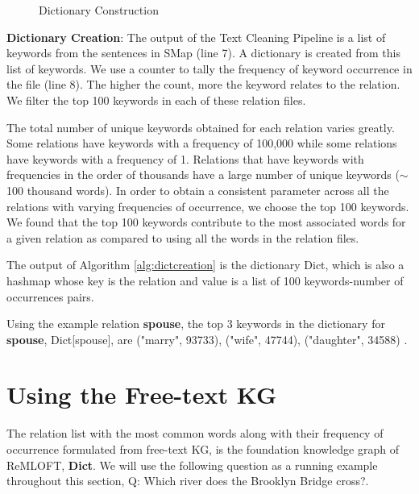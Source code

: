 \begin{sloppypar}
\begin{figure}
    \centering
    \caption{Dictionary Construction}
    \label{fig:graphConstruct}
\end{figure}

\textbf{Dictionary Creation}: The output of the Text Cleaning Pipeline is a list of keywords from the sentences in SMap (line 7). A dictionary is created from this list of keywords. We use a counter to tally the frequency of keyword occurrence in the file (line 8). The higher the count, more the keyword relates to the relation. We filter the top 100 keywords in each of these relation files. 

The total number of unique keywords obtained for each relation varies greatly. Some relations have keywords with a frequency of 100,000 while some relations have keywords with a frequency of 1. Relations that have keywords with frequencies in the order of thousands have a large number of unique keywords ($\sim$ 100 thousand words). In order to obtain a consistent parameter across all the relations with varying frequencies of occurrence, we choose the top 100 keywords. We found that the top 100 keywords contribute to the most associated words for a given relation as compared to using all the words in the relation files.

The output of Algorithm \ref{alg:dictcreation} is the dictionary Dict, which is also a hashmap whose key is the relation and value is a list of 100 keywords-number of occurrences pairs.

Using the example relation \textbf{spouse}, the top 3 keywords in the dictionary for \textbf{spouse}, Dict[spouse], are {\selectfont
("marry", 93733), ("wife", 47744), ("daughter", 34588)
}.
\section{Using the Free-text KG}
{\label{usingfreetextkg}}
The relation list with the most common words along with their frequency of occurrence formulated from free-text KG, is the foundation knowledge graph of ReMLOFT, \textbf{Dict}. We will use the following question as a running example throughout this section, Q: {\selectfont Which river does the Brooklyn Bridge cross?}.


\end{sloppypar}
